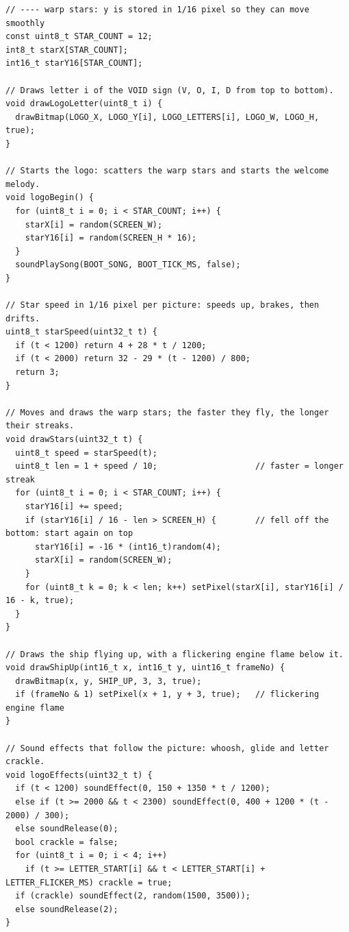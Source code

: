 \documentclass[11pt,a4paper]{article}
\begin{document}
\begin{lstlisting}[language=Arduino]
// ---- warp stars: y is stored in 1/16 pixel so they can move smoothly
const uint8_t STAR_COUNT = 12;
int8_t starX[STAR_COUNT];
int16_t starY16[STAR_COUNT];

// Draws letter i of the VOID sign (V, O, I, D from top to bottom).
void drawLogoLetter(uint8_t i) {
  drawBitmap(LOGO_X, LOGO_Y[i], LOGO_LETTERS[i], LOGO_W, LOGO_H, true);
}

// Starts the logo: scatters the warp stars and starts the welcome melody.
void logoBegin() {
  for (uint8_t i = 0; i < STAR_COUNT; i++) {
    starX[i] = random(SCREEN_W);
    starY16[i] = random(SCREEN_H * 16);
  }
  soundPlaySong(BOOT_SONG, BOOT_TICK_MS, false);
}

// Star speed in 1/16 pixel per picture: speeds up, brakes, then drifts.
uint8_t starSpeed(uint32_t t) {
  if (t < 1200) return 4 + 28 * t / 1200;
  if (t < 2000) return 32 - 29 * (t - 1200) / 800;
  return 3;
}

// Moves and draws the warp stars; the faster they fly, the longer their streaks.
void drawStars(uint32_t t) {
  uint8_t speed = starSpeed(t);
  uint8_t len = 1 + speed / 10;                    // faster = longer streak
  for (uint8_t i = 0; i < STAR_COUNT; i++) {
    starY16[i] += speed;
    if (starY16[i] / 16 - len > SCREEN_H) {        // fell off the bottom: start again on top
      starY16[i] = -16 * (int16_t)random(4);
      starX[i] = random(SCREEN_W);
    }
    for (uint8_t k = 0; k < len; k++) setPixel(starX[i], starY16[i] / 16 - k, true);
  }
}

// Draws the ship flying up, with a flickering engine flame below it.
void drawShipUp(int16_t x, int16_t y, uint16_t frameNo) {
  drawBitmap(x, y, SHIP_UP, 3, 3, true);
  if (frameNo & 1) setPixel(x + 1, y + 3, true);   // flickering engine flame
}

// Sound effects that follow the picture: whoosh, glide and letter crackle.
void logoEffects(uint32_t t) {
  if (t < 1200) soundEffect(0, 150 + 1350 * t / 1200);
  else if (t >= 2000 && t < 2300) soundEffect(0, 400 + 1200 * (t - 2000) / 300);
  else soundRelease(0);
  bool crackle = false;
  for (uint8_t i = 0; i < 4; i++)
    if (t >= LETTER_START[i] && t < LETTER_START[i] + LETTER_FLICKER_MS) crackle = true;
  if (crackle) soundEffect(2, random(1500, 3500));
  else soundRelease(2);
}


\end{lstlisting}
\end{document}
